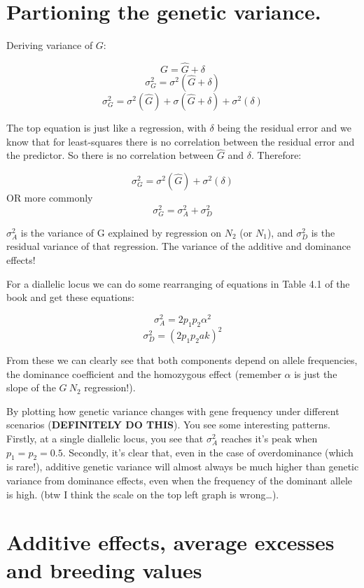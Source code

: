 \documentclass[
]{book}
\begin{document}
\hypertarget{partioning-the-genetic-variance.}{%
\section{Partioning the genetic variance.}\label{partioning-the-genetic-variance.}}

Deriving variance of \(G\):

\[ G = \hat{G} + \delta \]
\[ \sigma^2_G = \sigma^2(\hat{G} + \delta) \]
\[ \sigma^2_G = \sigma^2(\hat{G}) + \sigma(\hat{G} + \delta) + \sigma^2(\delta) \]

The top equation is just like a regression, with \(\delta\) being the residual error and we know that for least-squares there is no correlation between the residual error and the predictor. So there is no correlation between \(\hat{G}\) and \(\delta\). Therefore:

\[ \sigma^2_G = \sigma^2(\hat{G}) + \sigma^2(\delta) \]
OR more commonly
\[ \sigma^2_G = \sigma^2_A + \sigma^2_D \]

\(\sigma^2_A\) is the variance of G explained by regression on \(N_2\) (or \(N_1\)), and \(\sigma^2_D\) is the residual variance of that regression. The variance of the additive and dominance effects!

For a diallelic locus we can do some rearranging of equations in Table 4.1 of the book and get these equations:

\[ \sigma^2_A = 2p_1p_2\alpha^2 \]
\[ \sigma^2_D = (2p_1p_2ak)^2 \]

From these we can clearly see that both components depend on allele frequencies, the dominance coefficient and the homozygous effect (remember \(\alpha\) is just the slope of the \(G ~ N_2\) regression!).

By plotting how genetic variance changes with gene frequency under different scenarios (\textbf{DEFINITELY DO THIS}). You see some interesting patterns. Firstly, at a single diallelic locus, you see that \(\sigma^2_A\) reaches it's peak when \(p_1 = p_2 = 0.5\). Secondly, it's clear that, even in the case of overdominance (which is rare!), additive genetic variance will almost always be much higher than genetic variance from dominance effects, even when the frequency of the dominant allele is high. (btw I think the scale on the top left graph is wrong\ldots).

\hypertarget{additive-effects-average-excesses-and-breeding-values}{%
\section{Additive effects, average excesses and breeding values}\label{additive-effects-average-excesses-and-breeding-values}}
\end{document}
